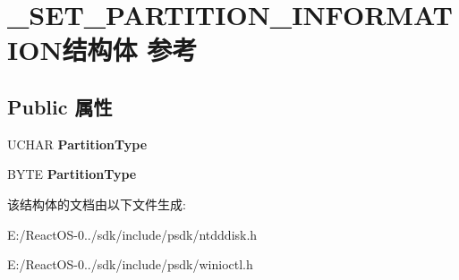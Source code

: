\hypertarget{struct___s_e_t___p_a_r_t_i_t_i_o_n___i_n_f_o_r_m_a_t_i_o_n}{}\section{\+\_\+\+S\+E\+T\+\_\+\+P\+A\+R\+T\+I\+T\+I\+O\+N\+\_\+\+I\+N\+F\+O\+R\+M\+A\+T\+I\+O\+N结构体 参考}
\label{struct___s_e_t___p_a_r_t_i_t_i_o_n___i_n_f_o_r_m_a_t_i_o_n}
\subsection*{Public 属性}
\begin{DoxyCompactItemize}
\item 
\mbox{\label{struct___s_e_t___p_a_r_t_i_t_i_o_n___i_n_f_o_r_m_a_t_i_o_n_ac3ccfdc120843e77392e34bbc0357c57}} 
U\+C\+H\+AR {\bfseries Partition\+Type}
\item 
\mbox{\label{struct___s_e_t___p_a_r_t_i_t_i_o_n___i_n_f_o_r_m_a_t_i_o_n_ac3ccfdc120843e77392e34bbc0357c57}} 
B\+Y\+TE {\bfseries Partition\+Type}
\end{DoxyCompactItemize}


该结构体的文档由以下文件生成\+:\begin{DoxyCompactItemize}
\item 
E\+:/\+React\+O\+S-\/0../sdk/include/psdk/ntdddisk.\+h\item 
E\+:/\+React\+O\+S-\/0../sdk/include/psdk/winioctl.\+h\end{DoxyCompactItemize}
